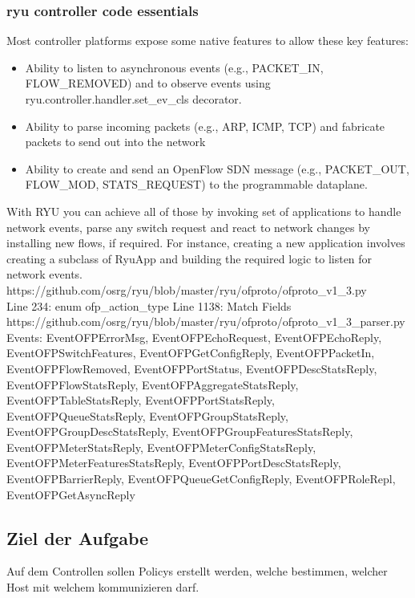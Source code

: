 \documentclass[a4,12pt]{scrartcl}
\begin{document}
\subsubsection{ryu	controller code essentials}
Most controller platforms expose some native features to allow these key features:
\begin{itemize}
\item Ability to listen to asynchronous events (e.g., PACKET\_IN, FLOW\_REMOVED) and to observe events using ryu.controller.handler.set\_ev\_cls decorator.
\item Ability to parse incoming packets (e.g., ARP, ICMP, TCP) and fabricate packets to send out into the network
\item Ability to create and send an OpenFlow SDN message (e.g., PACKET\_OUT, FLOW\_MOD, STATS\_REQUEST) to the programmable dataplane.
\end{itemize}
With RYU you can achieve all of those by invoking set of applications to handle network events, parse any switch request and react to network changes by installing new flows, if required. For instance, creating a new application involves creating a subclass of RyuApp and building the required logic to listen for network events.\\
https://github.com/osrg/ryu/blob/master/ryu/ofproto/ofproto\_v1\_3.py\\
Line 234: enum ofp\_action\_type Line 1138: Match Fields \\
https://github.com/osrg/ryu/blob/master/ryu/ofproto/ofproto\_v1\_3\_parser.py\\
Events: EventOFPErrorMsg, EventOFPEchoRequest, EventOFPEchoReply, EventOFPSwitchFeatures, EventOFPGetConfigReply, EventOFPPacketIn, EventOFPFlowRemoved, EventOFPPortStatus, EventOFPDescStatsReply, EventOFPFlowStatsReply, EventOFPAggregateStatsReply, EventOFPTableStatsReply, EventOFPPortStatsReply, EventOFPQueueStatsReply, EventOFPGroupStatsReply, EventOFPGroupDescStatsReply, EventOFPGroupFeaturesStatsReply, EventOFPMeterStatsReply, EventOFPMeterConfigStatsReply, EventOFPMeterFeaturesStatsReply, EventOFPPortDescStatsReply, EventOFPBarrierReply, EventOFPQueueGetConfigReply, EventOFPRoleRepl, EventOFPGetAsyncReply

\subsection{Ziel der Aufgabe}
Auf dem Controllen sollen Policys erstellt werden, welche bestimmen, welcher Host mit welchem kommunizieren darf. 
\end{document}
